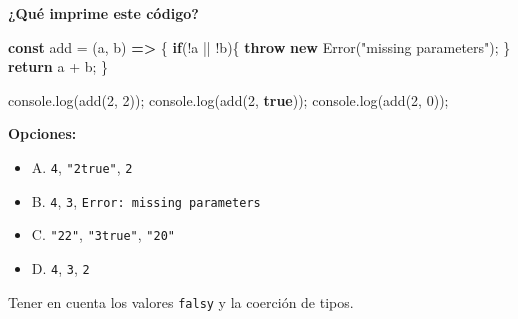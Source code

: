 \documentclass[
  letterpaper,
  DIV=11,
  numbers=noendperiod]{scrreprt}
\newenvironment{Shaded}{\begin{snugshade}}{\end{snugshade}}
\newcommand{\BuiltInTok}[1]{\textcolor[rgb]{0.00,0.23,0.31}{#1}}
\newcommand{\ControlFlowTok}[1]{\textcolor[rgb]{0.00,0.23,0.31}{\textbf{#1}}}
\newcommand{\DecValTok}[1]{\textcolor[rgb]{0.68,0.00,0.00}{#1}}
\newcommand{\FunctionTok}[1]{\textcolor[rgb]{0.28,0.35,0.67}{#1}}
\newcommand{\KeywordTok}[1]{\textcolor[rgb]{0.00,0.23,0.31}{\textbf{#1}}}
\newcommand{\NormalTok}[1]{\textcolor[rgb]{0.00,0.23,0.31}{#1}}
\newcommand{\OperatorTok}[1]{\textcolor[rgb]{0.37,0.37,0.37}{#1}}
\newcommand{\StringTok}[1]{\textcolor[rgb]{0.13,0.47,0.30}{#1}}
\providecommand{\tightlist}{%
  \setlength{\itemsep}{0pt}\setlength{\parskip}{0pt}}
\begin{document}
\textbf{¿Qué imprime este código?}

\begin{Shaded}
\begin{Highlighting}[]
\KeywordTok{const}\NormalTok{ add }\OperatorTok{=}\NormalTok{ (a}\OperatorTok{,}\NormalTok{ b) }\KeywordTok{=\textgreater{}}\NormalTok{ \{}
  \ControlFlowTok{if}\NormalTok{(}\OperatorTok{!}\NormalTok{a }\OperatorTok{||} \OperatorTok{!}\NormalTok{b)\{}
    \ControlFlowTok{throw} \KeywordTok{new} \BuiltInTok{Error}\NormalTok{(}\StringTok{"missing parameters"}\NormalTok{)}\OperatorTok{;}
\NormalTok{  \}}
  \ControlFlowTok{return}\NormalTok{ a }\OperatorTok{+}\NormalTok{ b}\OperatorTok{;}
\NormalTok{\}}

\BuiltInTok{console}\OperatorTok{.}\FunctionTok{log}\NormalTok{(}\FunctionTok{add}\NormalTok{(}\DecValTok{2}\OperatorTok{,} \DecValTok{2}\NormalTok{))}\OperatorTok{;}
\BuiltInTok{console}\OperatorTok{.}\FunctionTok{log}\NormalTok{(}\FunctionTok{add}\NormalTok{(}\DecValTok{2}\OperatorTok{,} \KeywordTok{true}\NormalTok{))}\OperatorTok{;}
\BuiltInTok{console}\OperatorTok{.}\FunctionTok{log}\NormalTok{(}\FunctionTok{add}\NormalTok{(}\DecValTok{2}\OperatorTok{,} \DecValTok{0}\NormalTok{))}\OperatorTok{;}
\end{Highlighting}
\end{Shaded}

\textbf{Opciones:}

\begin{itemize}
\tightlist
\item
  A. \texttt{4}, \texttt{"2true"}, \texttt{2}
\item
  B. \texttt{4}, \texttt{3}, \texttt{Error:\ missing\ parameters}
\item
  C. \texttt{"22"}, \texttt{"3true"}, \texttt{"20"}
\item
  D. \texttt{4}, \texttt{3}, \texttt{2}
\end{itemize}

\begin{tcolorbox}[enhanced jigsaw, left=2mm, toprule=.15mm, leftrule=.75mm, breakable, colback=white, coltitle=black, bottomtitle=1mm, arc=.35mm, rightrule=.15mm, colframe=quarto-callout-tip-color-frame, opacitybacktitle=0.6, toptitle=1mm, opacityback=0, titlerule=0mm, title=\textcolor{quarto-callout-tip-color}{\faLightbulb}\hspace{0.5em}{Pista}, bottomrule=.15mm, colbacktitle=quarto-callout-tip-color!10!white]

Tener en cuenta los valores \texttt{falsy} y la coerción de tipos.

\end{tcolorbox}
\end{document}
